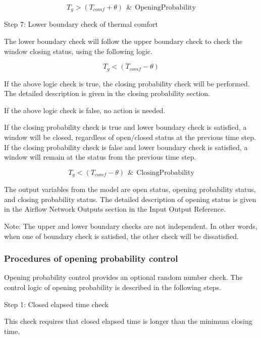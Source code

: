 \begin{equation}
T_g > \left(T_{comf} + \theta\right)~~\&~~\mathrm{OpeningProbability}
\end{equation}

Step 7: Lower boundary check of thermal comfort

The lower boundary check will follow the upper boundary check to check the window closing status, using the following logic.

\begin{equation}
T_g < \left(T_{comf} - \theta\right)
\end{equation}

If the above logic check is true, the closing probability check will be performed. The detailed description is given in the closing probability section.

If the above logic check is false, no action is needed.

If the closing probability check is true and lower boundary check is satisfied, a window will be closed, regardless of open/closed status at the previous time step. If the closing probability check is false and lower boundary check is satisfied, a window will remain at the status from the previous time step.

\begin{equation}
T_g < \left(T_{comf} - \theta\right)~~\&~~\mathrm{ClosingProbability}
\end{equation}

The output variables from the model are open status, opening probability status, and closing probability status. The detailed description of opening status is given in the Airflow Network Outputs section in the Input Output Reference.

Note: The upper and lower boundary checks are not independent. In other words, when one of boundary check is satisfied, the other check will be dissatisfied.

\subsubsection{Procedures of opening probability control}\label{procedures-of-opening-probability-control}

Opening probability control provides an optional random number check. The control logic of opening probability is described in the following steps.

Step 1: Closed elapsed time check

This check requires that closed elapsed time is longer than the minimum closing time.

